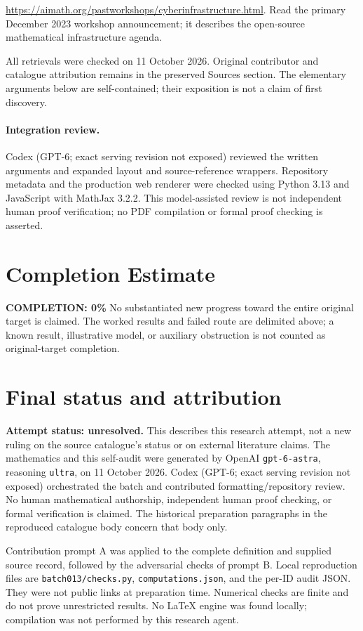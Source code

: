 \documentclass[11pt]{article}
\begin{document}
\url{https://aimath.org/pastworkshops/cyberinfrastructure.html}. Read the primary December 2023 workshop announcement; it describes the open-source mathematical infrastructure agenda.

All retrievals were checked on 11 October 2026. Original contributor and catalogue attribution remains in the preserved Sources section. The elementary arguments below are self-contained; their exposition is not a claim of first discovery.


\paragraph{Integration review.} Codex (GPT-6; exact serving revision not exposed) reviewed the written arguments and expanded layout and source-reference wrappers. Repository metadata and the production web renderer were checked using Python 3.13 and JavaScript with MathJax 3.2.2. This model-assisted review is not independent human proof verification; no PDF compilation or formal proof checking is asserted.

\section{Completion Estimate}
\noindent\textbf{COMPLETION: 0\%}
No substantiated new progress toward the entire original target is claimed. The worked results and failed route are delimited above; a known result, illustrative model, or auxiliary obstruction is not counted as original-target completion.

\section{Final status and attribution}
\textbf{Attempt status: unresolved.} This describes this research attempt, not a new ruling on the source catalogue's status or on external literature claims.
The mathematics and this self-audit were generated by OpenAI \texttt{gpt-6-astra}, reasoning \texttt{ultra}, on 11 October 2026. Codex (GPT-6; exact serving revision not exposed) orchestrated the batch and contributed formatting/repository review. No human mathematical authorship, independent human proof checking, or formal verification is claimed. The historical preparation paragraphs in the reproduced catalogue body concern that body only.

Contribution prompt A was applied to the complete definition and supplied source record, followed by the adversarial checks of prompt B. Local reproduction files are \texttt{batch013/checks.py}, \texttt{computations.json}, and the per-ID audit JSON. They were not public links at preparation time. Numerical checks are finite and do not prove unrestricted results. No LaTeX engine was found locally; compilation was not performed by this research agent.
\end{document}
